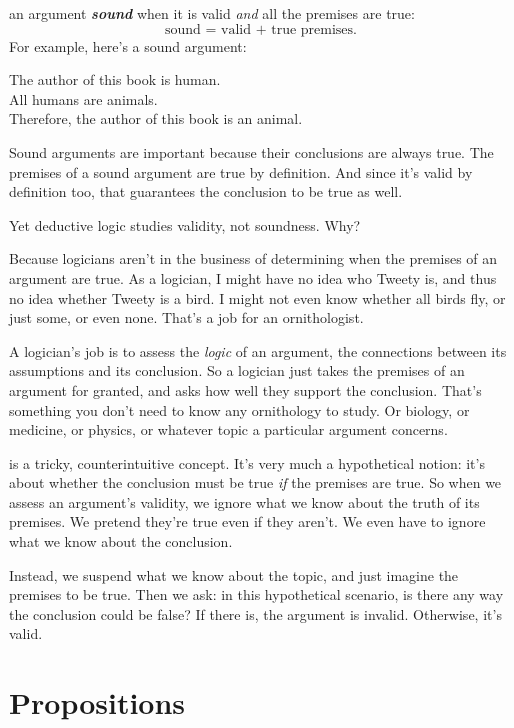 \documentclass[justified]{tufte-book}
\theoremstyle{definition}
\theoremstyle{definition}
\theoremstyle{definition}
\theoremstyle{definition}
\theoremstyle{remark}
\begin{document}
 an argument \textbf{\emph{sound}} when it is valid \emph{and} all the premises are true:
\[ \mbox{sound = valid + true premises}.\]
For example, here's a sound argument:

\begin{argument}
The author of this book is human.\\
All humans are animals.\\
Therefore, the author of this book is an animal.
\end{argument}

Sound arguments are important because their conclusions are always true. The premises of a sound argument are true by definition. And since it's valid by definition too, that guarantees the conclusion to be true as well.

Yet deductive logic studies validity, not soundness. Why?

Because logicians aren't in the business of determining when the premises of an argument are true. As a logician, I might have no idea who Tweety is, and thus no idea whether Tweety is a bird. I might not even know whether all birds fly, or just some, or even none. That's a job for an ornithologist.

A logician's job is to assess the \emph{logic} of an argument, the connections between its assumptions and its conclusion. So a logician just takes the premises of an argument for granted, and asks how well they support the conclusion. That's something you don't need to know any ornithology to study. Or biology, or medicine, or physics, or whatever topic a particular argument concerns.

 is a tricky, counterintuitive concept. It's very much a hypothetical notion: it's about whether the conclusion must be true \emph{if} the premises are true. So when we assess an argument's validity, we ignore what we know about the truth of its premises. We pretend they're true even if they aren't. We even have to ignore what we know about the conclusion.

Instead, we suspend what we know about the topic, and just imagine the premises to be true. Then we ask: in this hypothetical scenario, is there any way the conclusion could be false? If there is, the argument is invalid. Otherwise, it's valid.

\hypertarget{propositions}{%
\section{Propositions}\label{propositions}}
\end{document}
